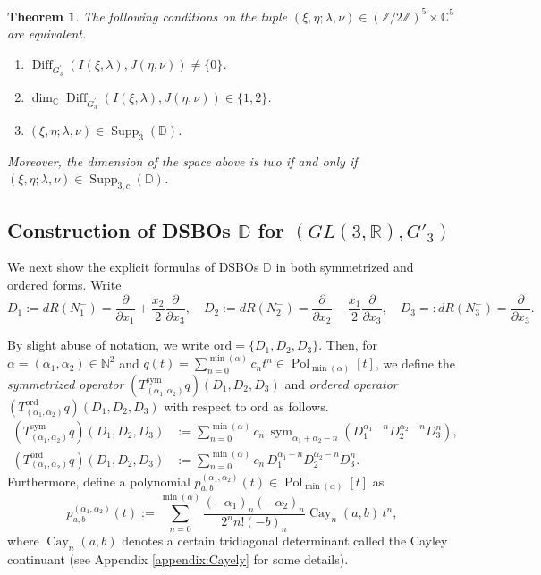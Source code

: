 \documentclass[a4paper,11pt,reqno]{amsart}
\newcommand{\DD}{\mathbb{D}}
\newcommand{\NN}{\mathbb{N}}
\newcommand{\0}{{\bf 0}}
\newcommand{\Z}{\mathbb{Z}}
\newcommand{\R}{\mathbb{R}}
\newcommand{\C}{\mathbb{C}}
\newcommand{\1}{{\bf 1}}
\DeclareMathOperator{\Cay}{Cay}
\DeclareMathOperator{\Pol}{Pol}
\newcommand{\ord}{{\mathrm{ord}}}
\DeclareMathOperator{\Supp}{Supp}
\DeclareMathOperator{\Diff}{Diff}
\DeclareMathOperator{\sym}{sym}
\theoremstyle{plain}
\newtheorem{theorem}[equation]{Theorem}
\theoremstyle{definition}
\numberwithin{equation}{section}
\theoremstyle{definition}
\begin{document}
\begin{theorem}
\label{thm:class3}
The following conditions on the tuple $(\xi, \eta; \lambda, \nu) \in (\Z/2\Z)^5 \times \C^5$ are equivalent.
\begin{enumerate}[label = \normalfont{(\roman*)}]
    \item $\Diff_{G_3^\prime}\left(I(\xi, \lambda), J(\eta, \nu)\right) \neq \{0\}$.
    
    \item $\dim_\C \Diff_{G_3^\prime}\left(I(\xi, \lambda), J(\eta, \nu)\right) \in \{1, 2\}$.

    \item $(\xi, \eta; \lambda, \nu) \in \Supp_3(\DD)$.
\end{enumerate}
Moreover, the dimension of the space above is two if and only 
if $(\xi, \eta; \lambda, \nu) \in \Supp_{3,c}(\DD)$.
\end{theorem}

\subsection{Construction of DSBOs \texorpdfstring{$\DD$}{ } for \texorpdfstring{$(GL(3,\R), G'_3)$}{(GL(3,R),G₃')}} 
\label{sec:const3}

We next show the explicit formulas of DSBOs $\DD$ in both symmetrized and ordered forms.
Write
\begin{equation*}
D_1:=dR(N_1^-)=\frac{\partial}{\partial x_1}+\frac{x_2}{2}\frac{\partial}{\partial x_3},\quad D_2:=dR(N_2^-)=\frac{\partial}{\partial x_2}-\frac{x_1}{2}\frac{\partial}{\partial x_3},\quad D_3=:dR(N_3^{-})=\frac{\partial}{\partial x_3}.
\end{equation*}

By slight abuse of notation, we write 
$\ord=\{D_1, D_2, D_3\}$.
Then, for $\alpha=(\alpha_1,\alpha_2) \in \NN^2$
and 
$q(t)=\sum_{n=0}^{\min(\alpha)}c_n t^n \in \Pol_{\min(\alpha)}[t]$, 
we define the \emph{symmetrized operator} 
$(T^{\mathrm{sym}}_{(\alpha_1, \alpha_2)} q)(D_1, D_2, D_3)$
and 
\emph{ordered operator}
$(T^\ord_{(\alpha_1, \alpha_2)} q)(D_1, D_2, D_3)$ 
with respect to $\ord$
as follows.
\begin{align}
(T^{\mathrm{sym}}_{(\alpha_1, \alpha_2)} q)(D_1, D_2, D_3)
&:=\sum_{n=0}^{\min(\alpha)}c_n\, \sym_{\alpha_1+\alpha_2-n}(D_1^{\alpha_1-n}D_2^{\alpha_2-n}D_3^n),
\label{eqn:symop}\\[3pt]
(T^\ord_{(\alpha_1, \alpha_2)} q)(D_1, D_2, D_3)
&:=\sum_{n=0}^{\min(\alpha)}c_n\, D_1^{\alpha_1-n}D_2^{\alpha_2-n}D_3^n.
\label{eqn:nonsymop}
\end{align}
Furthermore, define a polynomial $p^{(\alpha_1, \alpha_2)}_{a,b}(t) \in \Pol_{\min(\alpha)}[t]$ as 
\begin{equation}\label{eqn:pab}
p^{(\alpha_1, \alpha_2)}_{a,b}(t)
:=\sum_{n=0}^{\min(\alpha)}\frac{(-\alpha_1)_n(-\alpha_2)_n}{2^n n!(-b)_n}
\Cay_n(a,b)\,t^n,
\end{equation}
where $\Cay_n(a,b)$ denotes a certain tridiagonal determinant called 
the Cayley continuant (see Appendix \ref{appendix:Cayely} for some details).
\end{document}
